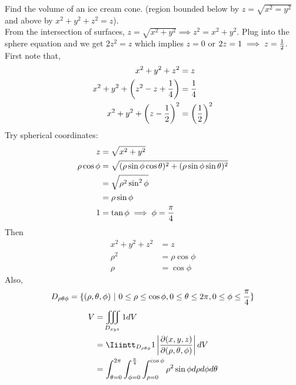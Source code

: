 \documentclass[english, 11pt]{article}
\begin{document}
\begin{exmp}
  Find the volume of an ice cream cone. (region bounded below by $z = \sqrt{x^2 = y^2}$ and above by $x^2 + y^2 + z^2 = z$). \\

  From the intersection of surfaces, $z = \sqrt{x^2 + y^2} \implies z^2 = x^2 + y^2$. Plug into the sphere equation and we get $2z^2 = z$ which implies $z = 0$ or $2z = 1 \implies z = \frac{1}{2}$. First note that,
  \begin{align*}
    x^2 + y^2 + z^2 & = z \\
    x^2 + y^2 + \left( z^2 - z + \frac{1}{4} \right) & = \frac{1}{4} \\
    x^2 + y^2 + \left( z - \frac{1}{2} \right)^2 & = \left( \frac{1}{2} \right)^2
  \end{align*}Try spherical coordinates:
  \begin{align*}
    z & = \sqrt{x^2 + y^2} \\
   \rho \cos \phi & = \sqrt{(\rho \sin \phi \cos \theta)^2 + (\rho \sin \phi \sin \theta)^2} \\
   & = \sqrt{\rho^2 \sin^2 \phi} \\
   & = \rho \sin \phi \\
   1 & = \tan \phi \implies \phi = \frac{\pi}{4}
  \end{align*}
  Then
  \begin{align*}
    x^2 + y^2 + z^2 & = z \\
    \rho^2 & = \rho \cos \phi \\
    \rho & = \cos \phi
  \end{align*}
  Also,
  \[ D_{\rho \theta \phi} = \{(\rho, \theta, \phi) \ | \ 0 \leq \rho \leq \cos \phi, 0 \leq \theta \leq 2\pi, 0 \leq \phi \leq \frac{\pi}{4}\} \]
  \begin{align*}
    V & = \Iiint_{D_{xyz}} 1 dV \\
    & = \Iiintt_{D_{\rho \theta \phi}} 1 \left| \f{\di(x,y,z)}{\di(\rho, \theta, \phi)} \right| dV \\
    & = \int_{\theta = 0}^{2\pi} \int_{\phi=0}^{\f{\pi}{4}} \int_{\rho = 0}^{\cos \phi} \rho^2 \sin \phi d\rho d\phi d\theta
  \end{align*}
\end{exmp}
\end{document}
